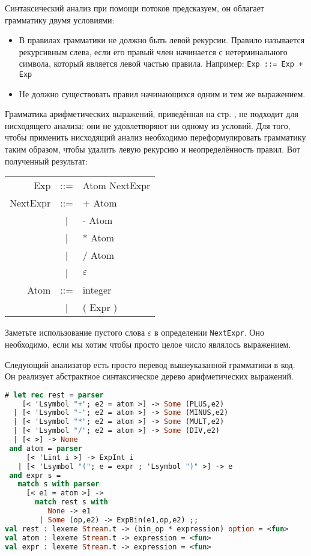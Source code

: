 Синтаксический анализ при помощи потоков предсказуем, он облагает грамматику
двумя условиями:

\begin{itemize}
	\item В правилах грамматики не должно быть левой рекурсии. Правило
называется рекурсивным слева, если его правый член начинается с нетерминального
символа, который является левой частью правила. Например: \texttt{Exp ::= Exp +
Exp}

	\item Не должно существовать правил начинающихся одним и тем же выражением.
\end{itemize}

Грамматика арифметических выражений, приведённая на стр.
\pageref{page_ref:Production_and_Recognition}, не подходит для нисходящего
анализа: они не удовлетворяют ни одному из условий. Для того, чтобы применить
нисходящий анализ необходимо переформулировать грамматику таким образом, чтобы
удалить левую рекурсию и неопределённость правил. Вот полученный результат:

\begin{center}
	\begin{tabular}{rcl}
		Exp & ::= & Atom NextExpr \\
		NextExpr & ::= & + Atom \\
		 & | & - Atom \\
		 & | & * Atom \\
		 & | & / Atom \\
 		 & | & $\varepsilon$ \\
		 Atom & ::= & integer \\
		 & | & ( Expr )
	\end{tabular}
\end{center}

Заметьте использование пустого слова $\varepsilon$ в определении
\texttt{NextExpr}. Оно необходимо, если мы хотим чтобы просто целое число
являлось выражением.

Следующий анализатор есть просто перевод вышеуказанной грамматики в код. Он
реализует абстрактное синтаксическое дерево арифметических выражений.

\begin{lstlisting}[language=Caml]
# let rec rest = parser
    [< 'Lsymbol "+"; e2 = atom >] -> Some (PLUS,e2)
  | [< 'Lsymbol "-"; e2 = atom >] -> Some (MINUS,e2)
  | [< 'Lsymbol "*"; e2 = atom >] -> Some (MULT,e2)
  | [< 'Lsymbol "/"; e2 = atom >] -> Some (DIV,e2)
  | [< >] -> None
 and atom = parser
     [< 'Lint i >] -> ExpInt i
   | [< 'Lsymbol "("; e = expr ; 'Lsymbol ")" >] -> e
 and expr s =
   match s with parser
     [< e1 = atom >] ->
       match rest s with
          None -> e1
        | Some (op,e2) -> ExpBin(e1,op,e2) ;;
val rest : lexeme Stream.t -> (bin_op * expression) option = <fun>
val atom : lexeme Stream.t -> expression = <fun>
val expr : lexeme Stream.t -> expression = <fun>
\end{lstlisting}


